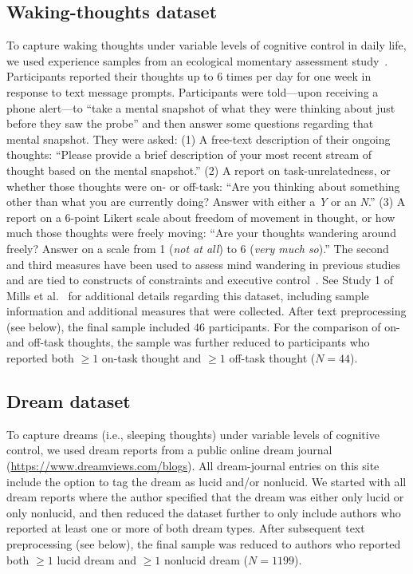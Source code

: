 \documentclass[10pt,a4paper,twocolumn]{article}
\begin{document}
\subsection*{Waking-thoughts dataset}
To capture waking thoughts under variable levels of cognitive control in daily life, we used experience samples from an ecological momentary assessment study~\cite{mills2021}. Participants reported their thoughts up to 6 times per day for one week in response to text message prompts. Participants were told---upon receiving a phone alert---to ``take a mental snapshot of what they were thinking about just before they saw the probe'' and then answer some questions regarding that mental snapshot. They were asked: (1) A free-text description of their ongoing thoughts: ``Please provide a brief description of your most recent stream of thought based on the mental snapshot.'' (2) A report on task-unrelatedness, or whether those thoughts were on- or off-task: ``Are you thinking about something other than what you are currently doing? Answer with either a \textit{Y} or an \textit{N}.'' (3) A report on a 6-point Likert scale about freedom of movement in thought, or how much those thoughts were freely moving: ``Are your thoughts wandering around freely? Answer on a scale from 1 (\textit{not at all}) to 6 (\textit{very much so}).'' The second and third measures have been used to assess mind wandering in previous studies and are tied to constructs of constraints and executive control~\cite{mills2018a}. See Study 1 of Mills et al.~\cite{mills2021} for additional details regarding this dataset, including sample information and additional measures that were collected. After text preprocessing (see below), the final sample included $46$ participants. For the comparison of on- and off-task thoughts, the sample was further reduced to participants who reported both $\ge 1$ on-task thought and $\ge 1$ off-task thought ($\mathit{N}=44$).

\subsection*{Dream dataset}
To capture dreams (i.e., sleeping thoughts) under variable levels of cognitive control, we used dream reports from a public online dream journal~\cite{schredl2022} (\url{https://www.dreamviews.com/blogs}). All dream-journal entries on this site include the option to tag the dream as lucid and/or nonlucid. We started with all dream reports where the author specified that the dream was either only lucid or only nonlucid, and then reduced the dataset further to only include authors who reported at least one or more of both dream types. After subsequent text preprocessing (see below), the final sample was reduced to authors who reported both $\ge 1$ lucid dream and $\ge 1$ nonlucid dream ($\mathit{N}=1199$).
\end{document}

